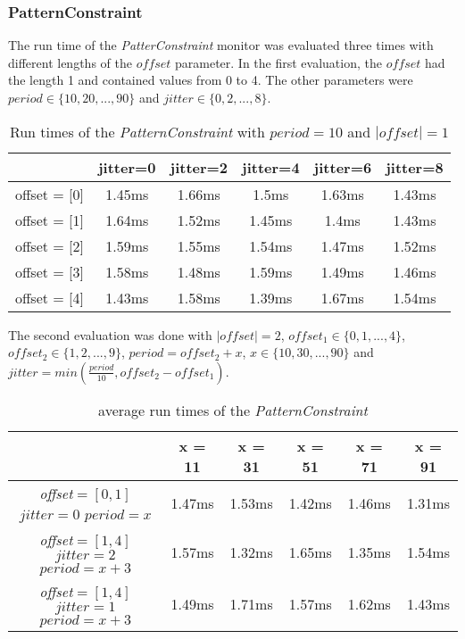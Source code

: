 \subsubsection{PatternConstraint}
The run time of the \textit{PatterConstraint} monitor was evaluated three times with different lengths of the $offset$ parameter. In the first evaluation, the $offset$ had the length 1 and contained values from 0 to 4. The other parameters were $period\in\{10,20,..., 90\}$ and $jitter\in\{0,2,...,8\}$.
\begin{table}
	\begin{tabular}{|c|c|c|c|c|c|}
		\hline
					& jitter=0 &  jitter=2 &  jitter=4 & jitter=6 & jitter=8 \\
		\hline
		offset = [0] & 1.45ms & 1.66ms & 1.5ms & 1.63ms & 1.43ms\\
		\hline
		offset = [1] & 1.64ms & 1.52ms & 1.45ms & 1.4ms & 1.43ms\\
		\hline
		offset = [2] & 1.59ms & 1.55ms & 1.54ms & 1.47ms & 1.52ms\\
		\hline
		offset = [3] & 1.58ms & 1.48ms & 1.59ms & 1.49ms & 1.46ms\\
		\hline
		offset = [4] & 1.43ms & 1.58ms & 1.39ms & 1.67ms & 1.54ms\\
		\hline
	\end{tabular}
	\centering
	\caption{Run times of the \textit{PatternConstraint} with $period=10$ and $|offset| = 1$}
	\label{tab:runtimePatternConstraint}
\end{table}
The second evaluation was done with $|offset| = 2$, $offset_1\in\{0, 1, ..., 4\}$, $offset_2\in\{1, 2, ..., 9\}$, $period=offset_2+x$, $x\in\{10, 30, ..., 90\}$ and $jitter = min(\frac{period}{10}, offset_2-offset_1)$.
\begin{table}
	\begin{tabular}{|c|c|c|c|c|c|}
		\hline
					& x = 11 & x = 31 & x = 51 & x = 71 & x = 91\\
		\hline
		\makecell{\textit{offset}$=[0,1]$\\$jitter=0$\\$period=x$}& 1.47ms & 1.53ms & 1.42ms & 1.46ms & 1.31ms\\
		\hline
		\makecell{\textit{offset}$=[1,4]$\\$jitter=2$\\$period=x+3$}& 1.57ms & 1.32ms & 1.65ms & 1.35ms & 1.54ms\\
		\hline
		\makecell{\textit{offset}$=[1,4]$\\$jitter=1$\\$period=x+3$}& 1.49ms & 1.71ms & 1.57ms & 1.62ms & 1.43ms\\
		\hline
	\end{tabular}
	\centering
	\caption{average run times of the \textit{PatternConstraint}}
	\label{tab:runtimePatternConstraint2}
\end{table}

